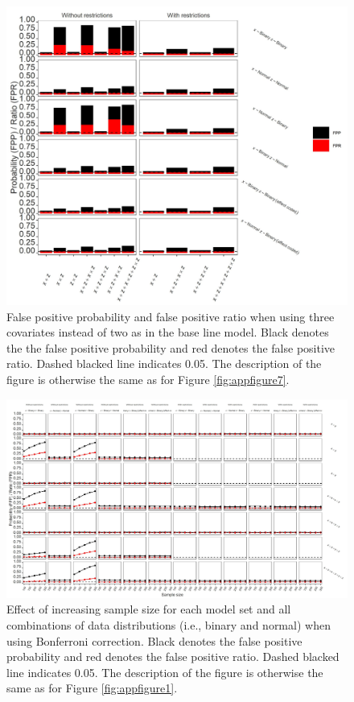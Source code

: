\begin{figure}[hbt!]
\includegraphics[scale=0.95]{R/Analysis/Result/Figures/Figure1CSIBon.jpeg}
\centering
\caption{False positive probability and false positive ratio when using three covariates instead of two as in the base line model. Black denotes the the false positive probability and red denotes the false positive ratio. Dashed blacked line indicates 0.05. The description of the figure is otherwise the same as for Figure \ref{fig:appfigure7}.
}
\label{fig:appfigure11}
\end{figure}

\begin{landscape}

\end{landscape}

\begin{landscape}
\begin{figure}[hbt!]
\includegraphics[scale=0.75]{R/Analysis/Result/Figures/Figure1DSIBon.jpeg}
\centering
\caption{Effect of increasing sample size for each model set and all combinations of data distributions (i.e., binary and normal) when using Bonferroni correction. Black denotes the false positive probability and red denotes the false positive ratio. Dashed blacked line indicates 0.05. The description of the figure is otherwise the same as for Figure \ref{fig:appfigure1}.}
\label{fig:appfigure12}
\end{figure}
\end{landscape}

\begin{landscape}
\scriptsize

\end{landscape}
